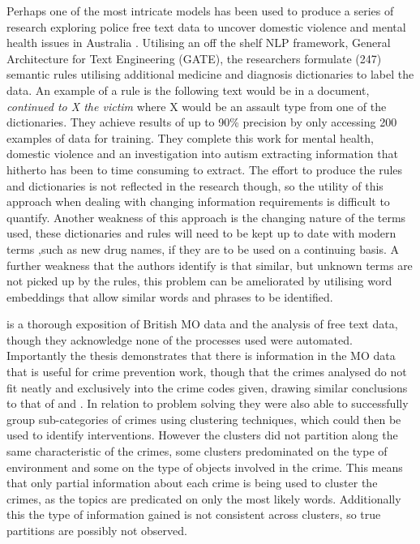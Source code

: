 Perhaps one of the most intricate models has been used to produce a series of research exploring police free text data to uncover domestic violence and mental health issues in Australia \parencite{karystianis2018automatic, karystianis2019automated, Hwang2020}. Utilising an off the shelf NLP framework, General Architecture for Text Engineering (GATE), the researchers formulate (247) semantic rules utilising additional medicine and diagnosis dictionaries  to label the data. An example of a rule is the following text would be in a document,  \emph{continued to X the victim} where X would be an assault type from one of the dictionaries.  They achieve results of up to 90\% precision by only accessing 200 examples of data for training.  They complete this work for mental health, domestic violence and an investigation into autism extracting information that hitherto has been to time consuming to extract. The effort to produce the rules and dictionaries is not reflected in the research though, so the utility of this approach when dealing with changing information requirements is difficult to quantify. Another weakness of this approach is the changing nature of the terms used, these dictionaries and rules will need to be kept up to date with modern terms ,such as new drug names, if they are to be used on a continuing basis. A further weakness that the authors identify is that similar, but unknown terms are not picked up by the rules, this problem can be ameliorated by utilising word embeddings that allow similar words and phrases to be identified.


\textcite{rogerson2016utility} is a thorough exposition of British MO data and the analysis of free text data, though they acknowledge none of the processes used were automated. Importantly the thesis demonstrates that there is information in the MO data that is useful for crime prevention work, though that the crimes analysed do not fit neatly and exclusively into the crime codes given, drawing similar conclusions to that of \textcite{birks2020unsupervised} and \textcite{kuang2017crime}. In relation to problem solving they were also able to successfully group sub-categories of crimes using clustering techniques, which could then be used to identify interventions. However the clusters did not partition along the same characteristic of the crimes, some clusters predominated on the type of environment and some on the type of objects involved in the crime. This means that only partial information about each crime is being used to cluster the crimes, as the topics are predicated on only the most likely words. Additionally this the type of information gained is not consistent across clusters, so true partitions are possibly not observed.  

